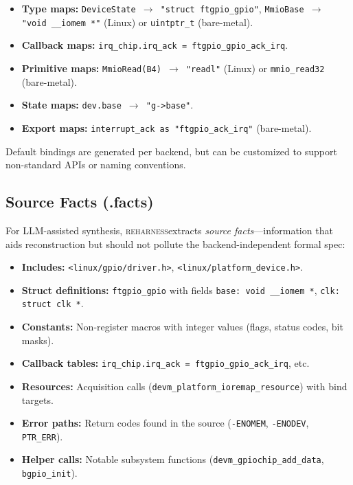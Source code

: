 \documentclass[sigplan, screen, review, anonymous]{acmart}
\newcommand{\reharness}{\textsc{reharness}}
\begin{document}
\begin{itemize}
\item \textbf{Type maps:} \texttt{DeviceState $\rightarrow$ "struct ftgpio\_gpio"}, \texttt{MmioBase $\rightarrow$ "void \_\_iomem *"} (Linux) or \texttt{uintptr\_t} (bare-metal).
\item \textbf{Callback maps:} \texttt{irq\_chip.irq\_ack = ftgpio\_gpio\_ack\_irq}.
\item \textbf{Primitive maps:} \texttt{MmioRead(B4) $\rightarrow$ "readl"} (Linux) or \texttt{mmio\_read32} (bare-metal).
\item \textbf{State maps:} \texttt{dev.base $\rightarrow$ "g->base"}.
\item \textbf{Export maps:} \texttt{interrupt\_ack as "ftgpio\_ack\_irq"} (bare-metal).
\end{itemize}

Default bindings are generated per backend, but can be customized to support non-standard APIs or naming conventions.

\subsection{Source Facts (.facts)}

For LLM-assisted synthesis, \reharness extracts \emph{source facts}---information that aids reconstruction but should not pollute the backend-independent formal spec:

\begin{itemize}
\item \textbf{Includes:} \texttt{<linux/gpio/driver.h>}, \texttt{<linux/platform\_device.h>}.
\item \textbf{Struct definitions:} \texttt{ftgpio\_gpio} with fields \texttt{base: void \_\_iomem *}, \texttt{clk: struct clk *}.
\item \textbf{Constants:} Non-register macros with integer values (flags, status codes, bit masks).
\item \textbf{Callback tables:} \texttt{irq\_chip.irq\_ack = ftgpio\_gpio\_ack\_irq}, etc.
\item \textbf{Resources:} Acquisition calls (\texttt{devm\_platform\_ioremap\_resource}) with bind targets.
\item \textbf{Error paths:} Return codes found in the source (\texttt{-ENOMEM}, \texttt{-ENODEV}, \texttt{PTR\_ERR}).
\item \textbf{Helper calls:} Notable subsystem functions (\texttt{devm\_gpiochip\_add\_data}, \texttt{bgpio\_init}).
\end{itemize}
\end{document}
